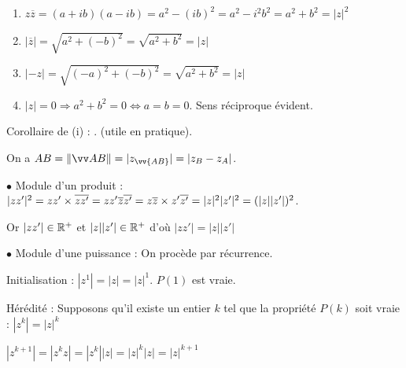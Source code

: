 \documentclass[10pt,a4paper]{article}
\begin{document}
\dem

\begin{enumerate}[$(i)$]
\item $z \overline{z}=(a+ib)(a-ib)=a^2-(ib)^2=a^2-i^2b^2=a^2+b^2=|z|^2$
\item $|\overline{z}|=\sqrt{a^2+(-b)^2}=\sqrt{a^2+b^2}=|z|$
\item $|-z|=\sqrt{(-a)^2+(-b)^2}=\sqrt{a^2+b^2}=|z|$
\item $|z|=0 \Rightarrow a^2+b^2=0 \iff a=b=0$. Sens réciproque évident.
\end{enumerate}

\medskip

\rema Corollaire de (i) : . (utile en pratique).


\dem On a $AB=\norme{AB}=|z_{\vv{AB}}|=|z_B-z_A|$.




\dem

$\bullet$ Module d'un produit :$|zz'|^2=zz' \times \overline{zz'}= zz' \overline{z} \overline{z'}=z \overline{z} \times z'\overline{z'} = |z|^2 |z'|^2=(|z||z'|)^2$.

Or $|zz'| \in \mathbb{R}^+$ et $|z||z'| \in \mathbb{R}^+$ d'où $|zz'|=|z||z'|$

$\bullet$  Module d'une puissance : On procède par récurrence.

Initialisation : $|z^1|=|z|=|z|^1$. $P(1)$ est vraie.

Hérédité : Supposons qu'il existe un entier $k$ tel que la propriété $P(k)$ soit vraie : $|z^k|=|z|^k$

$|z^{k+1}|=|z^kz|=|z^k||z|=|z|^k|z|=|z|^{k+1}$
\end{document}

